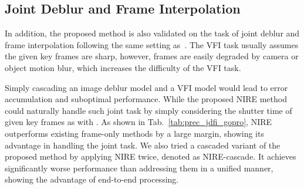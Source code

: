 \documentclass[10pt,twocolumn,letterpaper]{article}
\begin{document}
\subsection{Joint Deblur and Frame Interpolation}
In addition, the proposed method is also validated on the task of joint deblur and frame interpolation following the same setting as~\cite{DeMFI}. The VFI task usually assumes the given key frames are sharp, however, frames are easily degraded by camera or object motion blur, which increases the difficulty of the VFI task.

\begin{table}[t!]
\centering
\caption{Performance on joint deblur and frame interpolation.}
\end{table}

Simply cascading an image deblur model and a VFI model would lead to error accumulation and suboptimal performance.
While the proposed NIRE method could naturally handle such joint task by simply considering the shutter time of given key frames as  with .
As shown in Tab.~\ref{tab:prec_jdfi_gopro}, NIRE outperforms existing frame-only methods by a large margin, 
showing its advantage in handling the joint task.
We also tried a cascaded variant of the proposed method by applying NIRE twice, denoted as NIRE-cascade.
It achieves significantly worse performance than addressing them in a unified manner, showing the advantage of end-to-end processing.
\end{document}
